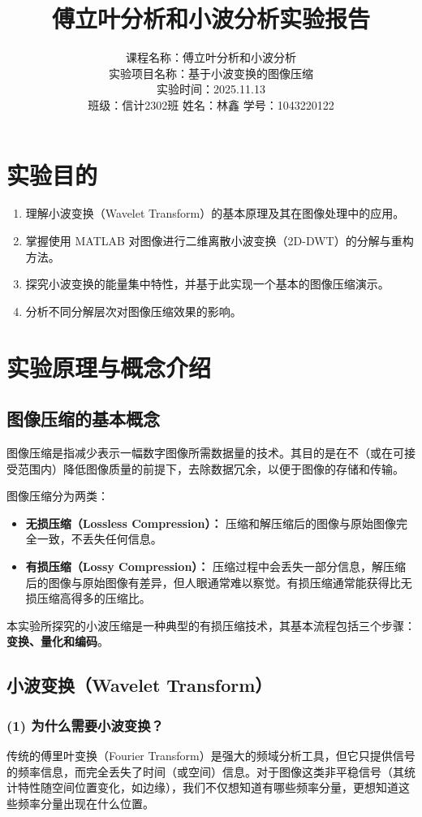 \documentclass[a4paper]{ctexart}
\title{傅立叶分析和小波分析实验报告}
\author{
	课程名称：傅立叶分析和小波分析 \\
	实验项目名称：基于小波变换的图像压缩 \\
	实验时间：2025.11.13 \\
	班级：信计2302班 \quad 姓名：林鑫 \quad 学号：1043220122
}
\date{} %
\begin{document}
	
	\maketitle      %
	\tableofcontents %
	\newpage
	
	\section{实验目的}
	\begin{enumerate}
		\item 理解小波变换（Wavelet Transform）的基本原理及其在图像处理中的应用。
		\item 掌握使用 MATLAB 对图像进行二维离散小波变换（2D-DWT）的分解与重构方法。
		\item 探究小波变换的能量集中特性，并基于此实现一个基本的图像压缩演示。
		\item 分析不同分解层次对图像压缩效果的影响。
	\end{enumerate}
	
	\section{实验原理与概念介绍}
	\subsection{图像压缩的基本概念}
	图像压缩是指减少表示一幅数字图像所需数据量的技术。其目的是在不（或在可接受范围内）降低图像质量的前提下，去除数据冗余，以便于图像的存储和传输。
	
	图像压缩分为两类：
	\begin{itemize}
		\item \textbf{无损压缩（Lossless Compression）：} 压缩和解压缩后的图像与原始图像完全一致，不丢失任何信息。
		\item \textbf{有损压缩（Lossy Compression）：} 压缩过程中会丢失一部分信息，解压缩后的图像与原始图像有差异，但人眼通常难以察觉。有损压缩通常能获得比无损压缩高得多的压缩比。
	\end{itemize}
	本实验所探究的小波压缩是一种典型的有损压缩技术，其基本流程包括三个步骤：\textbf{变换、量化和编码}。
	
	\subsection{小波变换（Wavelet Transform）}
	\subsubsection{(1) 为什么需要小波变换？}
	传统的傅里叶变换（Fourier Transform）是强大的频域分析工具，但它只提供信号的频率信息，而完全丢失了时间（或空间）信息。对于图像这类非平稳信号（其统计特性随空间位置变化，如边缘），我们不仅想知道有哪些频率分量，更想知道这些频率分量出现在什么位置。
	
\end{document}
